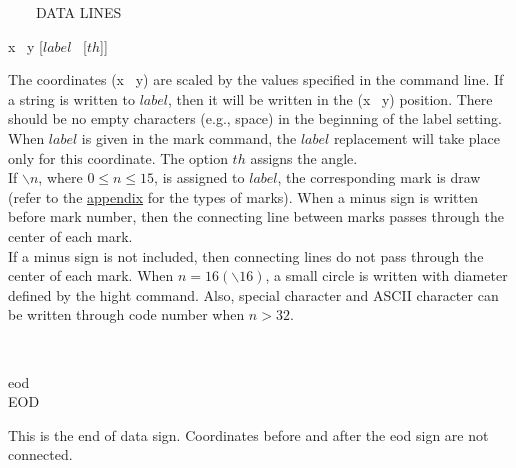 \begin{qsection}{\ ~~~DATA LINES}
\begin{minipage}[t]{5.5cm}
 x ~y [$label$~ [$th$]]
\end{minipage}
\begin{minipage}[t]{9cm}
The coordinates (x ~y) are scaled by the values specified in the
command line.
If a string is written to $label$, then it will be written
in the (x ~y) position.
There should be no empty characters (e.g., space) in the beginning of the label
setting.
When $label$ is given in the mark command,
the $label$ replacement will take place only for this coordinate.
The option $th$ assigns the angle.\\
If $\backslash n$, where $0 \leq n \leq 15$, is assigned to $label$,
the corresponding mark is draw (refer to the \hyperlink{lmark}{appendix} for the types of
marks).
When a minus sign is written before mark number,
then the connecting line between marks passes through the center of
each mark.\\
If a minus sign is not included, then connecting lines do not pass
through the center of each mark.
When $n=16(\backslash 16)$, a small circle is written with
diameter defined by the hight command.
Also, special character and ASCII character can be written through
code number when $n>32$.
\end{minipage}\\

\begin{minipage}[t]{5.5cm}
 eod\\
EOD
\end{minipage}
\begin{minipage}[t]{9cm}
This is the end of data sign.
Coordinates before and after the eod sign are not connected.
\end{minipage}
\end{qsection}
\newpage
